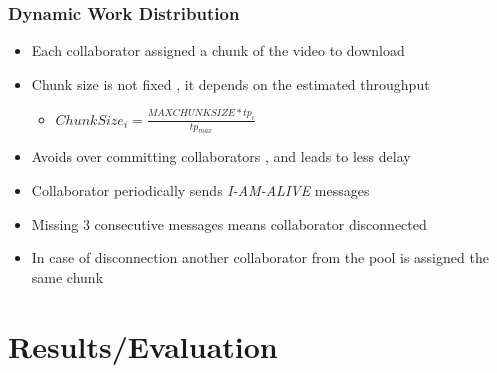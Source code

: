 \documentclass{beamer} %
\begin{document}
\begin{frame}
\frametitle{Dynamic Work Distribution}
\begin{itemize}
\item Each collaborator assigned a chunk of the video to download
\item Chunk size is not fixed , it depends on the estimated throughput
\begin{itemize}
\item $Chunk Size_{i}=\frac{MAX CHUNK SIZE * tp_{i}}{tp_{max}}$
\end{itemize}
\item Avoids over committing collaborators , and leads to less delay
\item Collaborator periodically sends \textit{I-AM-ALIVE} messages
\item Missing 3 consecutive messages means collaborator disconnected
\item In case of disconnection another collaborator from the pool is assigned the same chunk
\end{itemize}
\end{frame}
\section{Results/Evaluation}
\end{document}

